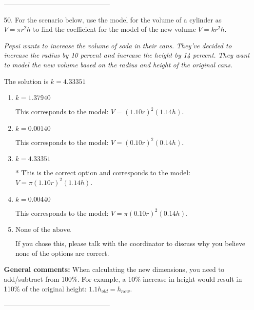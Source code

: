 \documentclass{article}[14pt]
\begin{document}
-----------------------------------------------

50. For the scenario below, use the model for the volume of a cylinder as $V = \pi r^2 h$ to find the coefficient for the model of the new volume $V = k r^2 h$.
\begin{center} \textit{Pepsi wants to increase the volume of soda in their cans. They've decided to increase the radius by 10 percent and increase the height by 14 percent. They want to model the new volume based on the radius and height of the original cans.} \end{center} 
The solution is $ k = 4.33351 $ 

\begin{enumerate}[label=\Alph*.] 
\item $ k = 1.37940 $ 

 This corresponds to the model: $V = (1.10 r)^2 (1.14 h)$. 
\item $ k = 0.00140 $ 

 This corresponds to the model: $V = (0.10 r)^2 (0.14 h)$. 
\item $ k = 4.33351 $ 

 * This is the correct option and corresponds to the model: $V = \pi (1.10 r)^2 (1.14 h)$. 
\item $ k = 0.00440 $ 

 This corresponds to the model: $V = \pi (0.10 r)^2 (0.14 h)$. 
\item $ \text{None of the above.} $ 

 If you chose this, please talk with the coordinator to discuss why you believe none of the options are correct. 
\end{enumerate} 
 
\textbf{General comments:} When calculating the new dimensions, you need to add/subtract from 100\%. For example, a 10\% increase in height would result in 110\% of the original height: $1.1h_{old} = h_{new}$.

-----------------------------------------------
\end{document}
